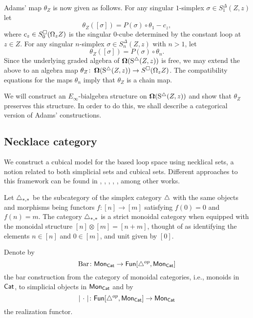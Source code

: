 Adams' map $\theta_Z$ is now given as follows.
For any singular $1$-simplex $\sigma \in S^{\Delta}_1(Z, z)$ let
$$\theta_Z([\sigma])= P(\sigma) \circ \theta_1 - c_z,$$
where $c_z \in S^{\square}_0(\Omega_z Z)$ is the singular $0$-cube determined by the constant loop at $z \in Z.$ For any singular $n$-simplex $\sigma \in S^{\Delta}_n(Z, z)$ with $n>1$, let
$$\theta_Z([\sigma])= P(\sigma) \circ \theta_n.$$ Since the underlying graded algebra of $\operatorname{\mathbf{\Omega}}(\operatorname{S^{\triangle}}(Z, z))$ is free, we may extend the above to an algebra map $\theta_Z \colon \operatorname{\mathbf{\Omega}}(\operatorname{S^{\triangle}}(Z, z)) \to S^{\square}(\Omega_z Z)$.
The compatibility equations for the maps $\theta_n$ imply that $\theta_Z$ is a chain map.

We will construct an $E_{\infty}$-bialgebra structure on $\operatorname{\mathbf{\Omega}}(\operatorname{S^{\triangle}}(Z, z))$ and show that $\theta_Z$ preserves this structure.
In order to do this, we shall describe a categorical version of Adams' constructions.

\subsection{Necklace category}

We construct a cubical model for the based loop space using necklical sets, a notion related to both simplicial sets and cubical sets.
Different approaches to this framework can be found in \cite{baues1998hopf}, \cite{galvez2020hopf}, \cite{dugger2011rigidification}, \cite{rivera2018cubical}, \cite{rivera2019path}, among other works.

Let $\triangle_{*,*}$ be the subcategory of the simplex category $\triangle$ with the same objects and morphisms being functors $f \colon [n] \to [m]$ satisfying $f(0) = 0$ and $f(n) = m$.
The category $\triangle_{*,*}$ is a strict monoidal category when equipped with the monoidal structure $[n] \otimes [m] = [n+m]$, thought of as identifying the elements $n \in [n]$ and $0 \in [m]$, and unit given by $[0]$.

Denote by
\begin{equation*}
\operatorname{Bar} \colon \mathsf{Mon}_{\mathsf{Cat}} \to \mathsf{Fun}[\triangle^{op}, \mathsf{Mon}_{\mathsf{Cat}}]
\end{equation*}
the bar construction from the category of monoidal categories, i.e., monoids in $\mathsf{Cat}$, to simplicial objects in $\mathsf{Mon}_{\mathsf{Cat}}$ and by
\begin{equation*}
\vert{\ \cdot \ }\vert \colon \mathsf{Fun}[\triangle^{op}, \mathsf{Mon}_{\mathsf{Cat}}] \to \mathsf{Mon}_{\mathsf{Cat}}
\end{equation*}
the realization functor.

